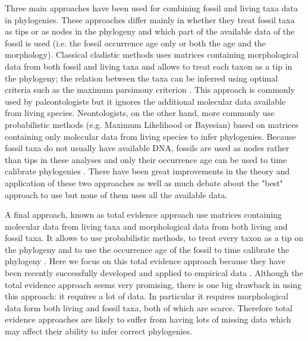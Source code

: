 \documentclass[12pt,letterpaper]{article}
\begin{document}
Three main approaches have been used for combining fossil and living taxa data in phylogenies.
These approaches differ mainly in whether they treat fossil taxa as tips or as nodes in the phylogeny and which part of the available data of the fossil is used (i.e. the fossil occurrence age only or both the age and the morphology).
Classical cladistic methods uses matrices containing morphological data from both fossil and living taxa and allows to treat each taxon as a tip in the phylogeny; the relation between the taxa can be inferred using optimal criteria such as the maximum parsimony criterion \citep{simpson1945}.
This approach is commonly used by paleontologists but it ignores the additional molecular data available from living species.
Neontologists, on the other hand, more commonly use probabilistic methods (e.g. Maximum Likelihood or Bayesian) based on matrices containing only molecular data from living species to infer phylogenies.
Because fossil taxa do not usually have available DNA, fossils are used as nodes rather than tips in these analyses and only their occurrence age can be used to time calibrate phylogenies \citep{zuckerkandl1965}.
There have been great improvements in the theory and application of these two approaches \citep[e.g.][]{bapsta2013,stadlerdating2013,heaththe2013} as well as much debate about the "best" approach to use \citep[e.g.][]{spencerefficacy2013} but none of them uses all the available data.

A final approach, known as total evidence approach use matrices containing molecular data from living taxa and morphological data from both living and fossil taxa. %
It allows to use probabilistic methods, to treat every taxon as a tip on the phylogeny and to use the occurrence age of the fossil to time calibrate the phylogeny \citep{eernissetaxonomic1993}.
Here we focus on this total evidence approach because they have been recently successfully developed and applied to empirical data \citep{pyrondivergence2011,ronquista2012,schragocombining2013}.  %
Although the total evidence approach seems very promising, there is one big drawback in using this approach: it requires a lot of data.
In particular it requires morphological data form both living and fossil taxa, both of which are scarce.
Therefore total evidence approaches are likely to suffer from having lots of missing data which may affect their ability to infer correct phylogenies. %
\end{document}
